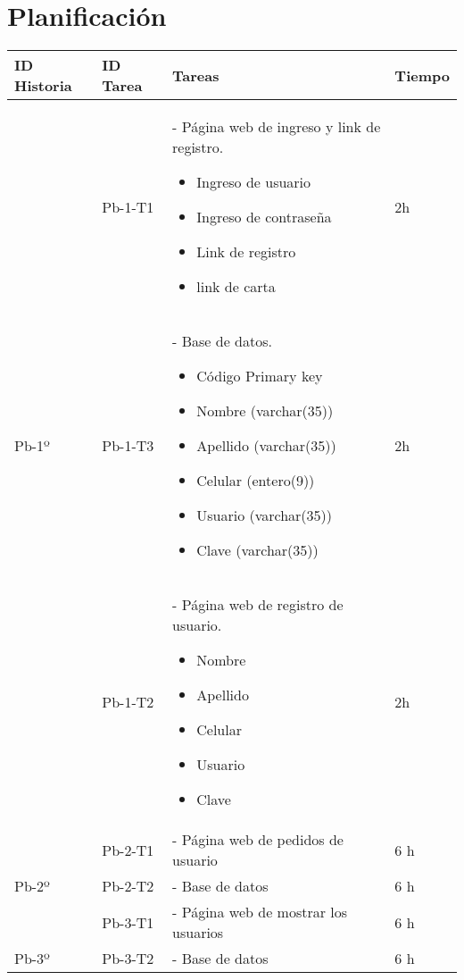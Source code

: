 \chapter{Planificación}
\begin{table}[htbp]
	\begin{center}
		\begin{tabular}{| p{2.0cm}|p{2.0cm} | p{5.5 cm} | p{3.0cm}| }
			\hline
			\centering\textbf{ID Historia} & \centering\textbf{ID Tarea}& \textbf{Tareas} & \textbf{Tiempo} 
			
			\\\hline
			
			 & \centering Pb-1-T1 & - Página web de ingreso y link de registro.
			 	 \begin{itemize}	\item Ingreso de usuario 
									\item Ingreso de contraseña	
									\item Link de registro 
									\item link de carta\end{itemize}	& 2h \\

			\centering Pb-1º & \centering Pb-1-T3 & - Base de datos.
			\begin{itemize} 
				\item Código Primary key  
				\item Nombre (varchar(35))
				\item Apellido (varchar(35))
				\item Celular (entero(9)) 
				\item Usuario (varchar(35))
				\item Clave (varchar(35)) 
			\end{itemize} & 2h
			\\ & \centering Pb-1-T2  & - Página web de registro de usuario.
			\begin{itemize}
				\item Nombre
				\item Apellido
				\item Celular
				\item Usuario
				\item Clave
			\end{itemize}   & 2h
			\\\hline
			 & \centering Pb-2-T1 & - Página web de pedidos de usuario & 6 h
			\\
			\centering Pb-2º
			& \centering Pb-2-T2 & - Base de datos & 6 h
			
			\\\hline
			& \centering Pb-3-T1 & - Página web de mostrar los usuarios & 6 h
			\\
			\centering Pb-3º
			& \centering Pb-3-T2 & - Base de datos & 6 h
			
			\\\hline

		\end{tabular}
	\end{center}
\end{table}
